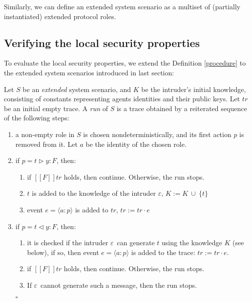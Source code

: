 \documentclass{entcs} \usepackage{entcsmacro}
\newcommand{\HB}{\hfill{$\square$}}
\newcommand{\U}{\ensuremath{\:\cup\:}}
\newcommand{\INT}{\ensuremath{\varepsilon}}
\begin{document}
Similarly, we can define an extended system scenario as a multiset of
(partially instantiated) extended protocol roles. 

\subsection{Verifying the local security properties}
\label{verification}

To evaluate the local security properties, we extend the Definition
\ref{procedure} to the extended system scenarios introduced in last
section:

\begin{definition}
\label{procedure}
Let $S$ be an \emph{extended} system scenario, and $K$ be the intruder's initial
knowledge, consisting of constants representing agents identities and
their public keys.  Let $tr$ be an initial empty trace.  A \emph{run} of $S$
is a trace obtained by a reiterated sequence of the following steps:
\begin{enumerate}
\item a non-empty role in $S$ is chosen nondeterministically, and   
  its first action $p$ is removed from it. Let $a$ be the identity of 
the chosen role.

\item if $p = t \triangleright y : F$, then:
 \begin{enumerate}
  \item if $[\![F]\!]tr$ holds, then continue. Otherwise, the run stops.
  \item $t$ is added to the knowledge of the intruder $\varepsilon$,
  $K := K \U \{t\}$
  \item event $e = \langle a : p \rangle$ is added to $tr$, $tr := tr 
\cdot e$
\end{enumerate}

\item if $p =  t \triangleleft y :F $, then:
\begin{enumerate}
\item it is checked if the intruder \INT\ can generate $t$ using the
knowledge $K$ (see below), if so, then event $e = \langle a : p
\rangle$ is added to the trace: $tr := tr \cdot e $.
\item if $[\![F]\!]tr$ holds, then continue. Otherwise, the run stops.

\item If \INT\ cannot generate such a message, then the run stops.
\end{enumerate}\HB
\end{enumerate}
\end{definition}
\end{document}
